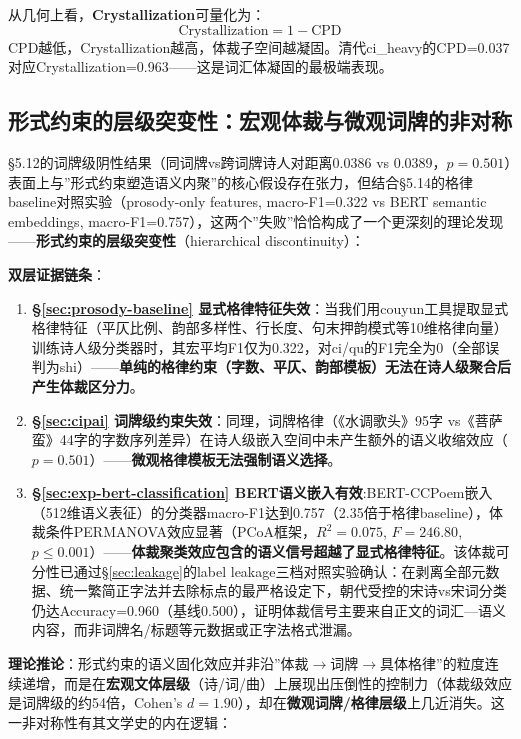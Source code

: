\documentclass[12pt,a4paper]{article}
\numberwithin{equation}{section}
\begin{document}
从几何上看，\textbf{Crystallization}可量化为：
\begin{equation}
\text{Crystallization} = 1 - \text{CPD}
\end{equation}
CPD越低，Crystallization越高，体裁子空间越凝固。清代ci\_heavy的CPD=0.037对应Crystallization=0.963——这是词汇体凝固的最极端表现。

\subsection{形式约束的层级突变性：宏观体裁与微观词牌的非对称}

§5.12的词牌级阴性结果（同词牌vs跨词牌诗人对距离0.0386 vs 0.0389，$p=0.501$）表面上与”形式约束塑造语义内聚”的核心假设存在张力，但结合§5.14的格律baseline对照实验（prosody-only features, macro-F1=0.322 vs BERT semantic embeddings, macro-F1=0.757），这两个”失败”恰恰构成了一个更深刻的理论发现——\textbf{形式约束的层级突变性}（hierarchical discontinuity）：

\textbf{双层证据链条}：
\begin{enumerate}
  \item \textbf{\S\ref{sec:prosody-baseline} 显式格律特征失效}：当我们用couyun工具提取显式格律特征（平仄比例、韵部多样性、行长度、句末押韵模式等10维格律向量）训练诗人级分类器时，其宏平均F1仅为0.322，对ci/qu的F1完全为0（全部误判为shi）——\textbf{单纯的格律约束（字数、平仄、韵部模板）无法在诗人级聚合后产生体裁区分力}。
  \item \textbf{\S\ref{sec:cipai} 词牌级约束失效}：同理，词牌格律（《水调歌头》95字 vs《菩萨蛮》44字的字数序列差异）在诗人级嵌入空间中未产生额外的语义收缩效应（$p=0.501$）——\textbf{微观格律模板无法强制语义选择}。
  \item \textbf{\S\ref{sec:exp-bert-classification} BERT语义嵌入有效}:BERT-CCPoem嵌入（512维语义表征）的分类器macro-F1达到0.757（2.35倍于格律baseline），体裁条件PERMANOVA效应显著（PCoA框架，$R^{2}=0.075$, $F=246.80$, $p\leq0.001$）——\textbf{体裁聚类效应包含的语义信号超越了显式格律特征}。该体裁可分性已通过§\ref{sec:leakage}的label leakage三档对照实验确认：在剥离全部元数据、统一繁简正字法并去除标点的最严格设定下，朝代受控的宋诗vs宋词分类仍达Accuracy=0.960（基线0.500），证明体裁信号主要来自正文的词汇—语义内容，而非词牌名/标题等元数据或正字法格式泄漏。
\end{enumerate}

\textbf{理论推论}：形式约束的语义固化效应并非沿”体裁$\to$词牌$\to$具体格律”的粒度连续递增，而是在\textbf{宏观文体层级}（诗/词/曲）上展现出压倒性的控制力（体裁级效应是词牌级的约54倍，Cohen's $d=1.90$），却在\textbf{微观词牌/格律层级}上几近消失。这一非对称性有其文学史的内在逻辑：
\end{document}
